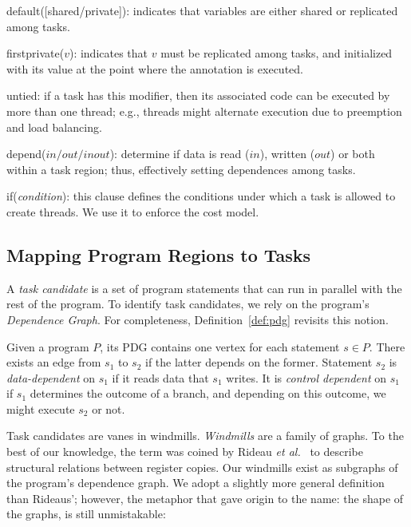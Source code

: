 \documentclass[sigplan,10pt,review,anonymous]{acmart}
\begin{document}
\begin{compactitem}
\item \textsf{default([shared/private])}: indicates that variables are either
shared or replicated among tasks.
\item \textsf{firstprivate($v$)}: indicates that $v$ must be replicated among
tasks, and initialized with its value at the point where the annotation is
executed.
\item \textsf{untied}: if a task has this modifier, then its associated code can
be executed by more than one thread; e.g., threads might alternate execution due
to preemption and load balancing.
\item \textsf{depend}($\mathit{in}/\mathit{out}/\mathit{inout}$):
determine if data is read ($\mathit{in}$), written ($\mathit{out}$) or both
within a task region; thus, effectively setting dependences among tasks.
\item \textsf{if}({\em condition}): this clause defines the conditions
under which a task is allowed to create threads.
We use it to enforce the cost model.
\end{compactitem}

\subsection{Mapping Program Regions to Tasks}
\label{sub:identification}

A {\em task candidate} is a set of program statements that can run in parallel
with the rest of the program.
To identify task candidates, we rely on the program's
{\em Dependence Graph}.
For completeness, Definition~\ref{def:pdg} revisits this notion.

\begin{definition}
\label{def:pdg}
Given a program $P$, its PDG contains one vertex for each statement $s \in P$.
There exists an edge from $s_1$ to $s_2$ if the latter depends on the former.
Statement $s_2$ is {\em data-dependent} on $s_1$ if it reads data that $s_1$
writes.
It is {\em control dependent} on $s_1$ if $s_1$ determines the outcome of a
branch, and depending on this outcome, we might execute $s_2$ or not.
\end{definition}

Task candidates are vanes in windmills.
{\em Windmills} are a family of graphs.
To the best of our knowledge, the term was coined by Rideau
{\em et al.}~\cite{Rideau08} to describe structural relations between register
copies.
Our windmills exist as subgraphs of the program's dependence graph.
We adopt a slightly more general definition than Rideaus'; however, the
metaphor that gave origin to the name: the shape of the graphs, is still
unmistakable:
\end{document}
